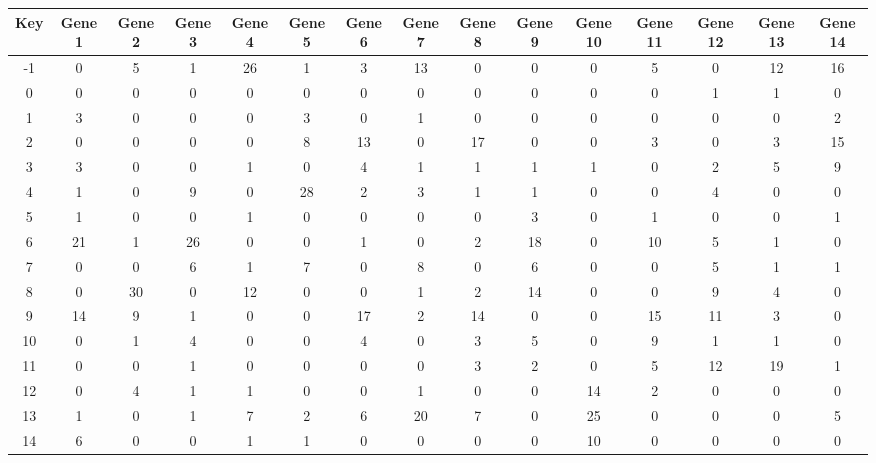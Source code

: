 \begin{tabular}{|c|c|c|c|c|c|c|c|c|c|c|c|c|c|c|}
\hline
Key & Gene 1 & Gene 2 & Gene 3 & Gene 4 & Gene 5 & Gene 6 & Gene 7 & Gene 8 & Gene 9 & Gene 10 & Gene 11 & Gene 12 & Gene 13 & Gene 14 \\
\hline
-1 & 0 & 5 & 1 & 26 & 1 & 3 & 13 & 0 & 0 & 0 & 5 & 0 & 12 & 16 \\
0 & 0 & 0 & 0 & 0 & 0 & 0 & 0 & 0 & 0 & 0 & 0 & 1 & 1 & 0 \\
1 & 3 & 0 & 0 & 0 & 3 & 0 & 1 & 0 & 0 & 0 & 0 & 0 & 0 & 2 \\
2 & 0 & 0 & 0 & 0 & 8 & 13 & 0 & 17 & 0 & 0 & 3 & 0 & 3 & 15 \\
3 & 3 & 0 & 0 & 1 & 0 & 4 & 1 & 1 & 1 & 1 & 0 & 2 & 5 & 9 \\
4 & 1 & 0 & 9 & 0 & 28 & 2 & 3 & 1 & 1 & 0 & 0 & 4 & 0 & 0 \\
5 & 1 & 0 & 0 & 1 & 0 & 0 & 0 & 0 & 3 & 0 & 1 & 0 & 0 & 1 \\
6 & 21 & 1 & 26 & 0 & 0 & 1 & 0 & 2 & 18 & 0 & 10 & 5 & 1 & 0 \\
7 & 0 & 0 & 6 & 1 & 7 & 0 & 8 & 0 & 6 & 0 & 0 & 5 & 1 & 1 \\
8 & 0 & 30 & 0 & 12 & 0 & 0 & 1 & 2 & 14 & 0 & 0 & 9 & 4 & 0 \\
9 & 14 & 9 & 1 & 0 & 0 & 17 & 2 & 14 & 0 & 0 & 15 & 11 & 3 & 0 \\
10 & 0 & 1 & 4 & 0 & 0 & 4 & 0 & 3 & 5 & 0 & 9 & 1 & 1 & 0 \\
11 & 0 & 0 & 1 & 0 & 0 & 0 & 0 & 3 & 2 & 0 & 5 & 12 & 19 & 1 \\
12 & 0 & 4 & 1 & 1 & 0 & 0 & 1 & 0 & 0 & 14 & 2 & 0 & 0 & 0 \\
13 & 1 & 0 & 1 & 7 & 2 & 6 & 20 & 7 & 0 & 25 & 0 & 0 & 0 & 5 \\
14 & 6 & 0 & 0 & 1 & 1 & 0 & 0 & 0 & 0 & 10 & 0 & 0 & 0 & 0 \\
\hline
\end{tabular}